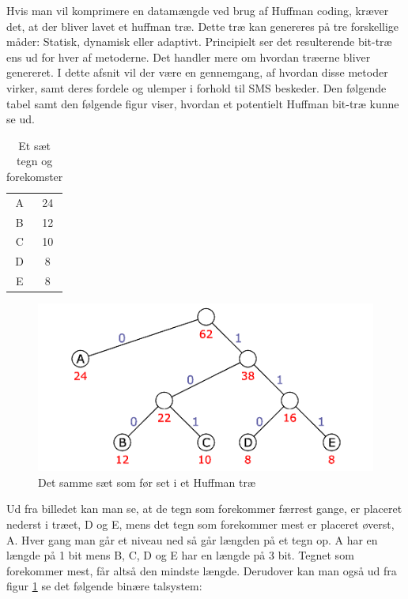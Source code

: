 Hvis man vil komprimere en datamængde ved brug af Huffman coding, kræver det, at der bliver lavet et huffman træ. Dette træ kan genereres på tre forskellige måder: Statisk, dynamisk eller adaptivt. Principielt ser det resulterende bit-træ ens ud for hver af metoderne. Det handler mere om hvordan træerne bliver genereret. I dette afsnit vil der være en gennemgang, af hvordan disse metoder virker, samt deres fordele og ulemper i forhold til SMS beskeder. Den følgende tabel samt den følgende figur viser, hvordan et potentielt Huffman bit-træ kunne se ud.

\begin{table}[H]
\begin{center}
\begin{tabular}{|c|c|}
\hline
\cellcolor{ForestGreen}\color{white}{\textbf{Tegn}}& \cellcolor{ForestGreen}\color{white}{\textbf{Forekomster}}\\[2ex] \hline
A & 24 \\ \hline
B & 12 \\ \hline
C & 10 \\ \hline
D & 8 \\ \hline
E & 8 \\ \hline
\end{tabular} 
\caption{Et sæt tegn og forekomster}
\end{center}
\end{table}

\begin{figure}[H]
\centering
\includegraphics[width=0.75\linewidth]{Billeder/huffman_tree.png}
\caption{Det samme sæt som før set i et Huffman træ \cite{Hufftree_1}}
\label{fig:huffmantree_fred}
\end{figure}

Ud fra billedet kan man se, at de tegn som forekommer færrest gange, er placeret nederst i træet, D og E, mens det tegn som forekommer mest er placeret øverst, A. Hver gang man går et niveau ned så går længden på et tegn op. A har en længde på 1 bit mens B, C, D og E har en længde på 3 bit. Tegnet som forekommer mest, får altså den mindste længde. Derudover kan man også ud fra figur \ref{fig:huffmantree_fred} se det følgende binære talsystem:

